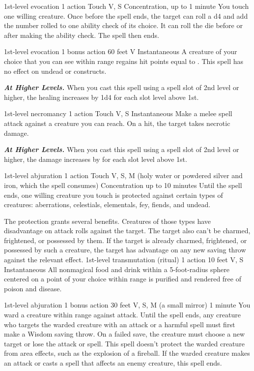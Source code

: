 \documentclass[10pt,twoside,twocolumn,openany]{book}
\newcommand{\castingModifier}{3}
\newcommand\impact[1]{
	\textbf{\textit{#1}}
}
\begin{document}
{1st-level evocation}
{\color{action} 1 action}
{Touch}
{V, S}
{{\color{concentration}Concentration}, up to 1 minute}
%
You touch one willing creature. Once before the spell ends, the target can roll a d4 and add the number rolled to one ability check of its choice. It can roll the die before or after making the ability check. The spell then ends.

{1st-level evocation}
{\color{bonusaction} 1 bonus action}
{60 feet}
{V}
{Instantaneous}
%
A creature of your choice that you can see within range regains hit points equal to \dice{1d4 + \castingModifier}. This spell has no effect on undead or constructs.

\impact{At Higher Levels.} When you cast this spell using a spell slot of 2nd level or higher, the healing increases by 1d4 for each slot level above 1st.

{1st-level necromancy}
{\color{action} 1 action}
{Touch}
{V, S}
{Instantaneous}
%
Make a melee spell attack against a creature you can reach. On a hit, the target takes  necrotic damage.

\impact{At Higher Levels.} When you cast this spell using a spell slot of 2nd level or higher, the damage increases by
 for each slot level above 1st.

{1st-level abjuration}
{\color{action} 1 action}
{Touch}
{V, S, M (holy water or powdered silver and iron, which the spell consumes)}
{{\color{concentration}Concentration} up to 10 minutes}
%
Until the spell ends, one willing creature you touch is protected against certain types of creatures: aberrations, celestials, elementals, fey, fiends, and undead.

The protection grants several benefits. Creatures of those types have disadvantage on attack rolls against the target. The target also can't be charmed, frightened, or possessed by them. If the target is already charmed, frightened, or possessed by such a creature, the target has advantage on any new saving throw against the relevant effect.
{1st-level transmutation {\color{ritual}(ritual)}}
{\color{action} 1 action}
{10 feet}
{V, S}
{Instantaneous}
%
All nonmagical food and drink within a 5-foot-radius sphere centered on a point of your choice within range is purified and rendered free of poison and disease.

{1st-level abjuration}
{\color{bonusaction}1 bonus action}
{30 feet}
{V, S, M (a small mirror)}
{1 minute}
%
You ward a creature within range against attack. Until the spell ends, any creature who targets the warded creature with an attack or a harmful spell must first make a Wisdom saving throw. On a failed save, the creature must choose a new target or lose the attack or spell. This spell doesn't protect the warded creature from area effects, such as the explosion of a fireball. If the warded creature makes an attack or casts a spell that affects an enemy creature, this spell ends.
\end{document}
